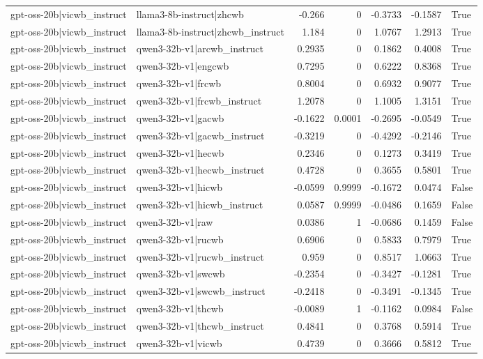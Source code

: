 \begin{table}
\begin{tabular}{l l r r r r l}
gpt-oss-20b|vicwb_instruct & llama3-8b-instruct|zhcwb & -0.266 & 0 & -0.3733 & -0.1587 & True \\
gpt-oss-20b|vicwb_instruct & llama3-8b-instruct|zhcwb_instruct & 1.184 & 0 & 1.0767 & 1.2913 & True \\
gpt-oss-20b|vicwb_instruct & qwen3-32b-v1|arcwb_instruct & 0.2935 & 0 & 0.1862 & 0.4008 & True \\
gpt-oss-20b|vicwb_instruct & qwen3-32b-v1|engcwb & 0.7295 & 0 & 0.6222 & 0.8368 & True \\
gpt-oss-20b|vicwb_instruct & qwen3-32b-v1|frcwb & 0.8004 & 0 & 0.6932 & 0.9077 & True \\
gpt-oss-20b|vicwb_instruct & qwen3-32b-v1|frcwb_instruct & 1.2078 & 0 & 1.1005 & 1.3151 & True \\
gpt-oss-20b|vicwb_instruct & qwen3-32b-v1|gacwb & -0.1622 & 0.0001 & -0.2695 & -0.0549 & True \\
gpt-oss-20b|vicwb_instruct & qwen3-32b-v1|gacwb_instruct & -0.3219 & 0 & -0.4292 & -0.2146 & True \\
gpt-oss-20b|vicwb_instruct & qwen3-32b-v1|hecwb & 0.2346 & 0 & 0.1273 & 0.3419 & True \\
gpt-oss-20b|vicwb_instruct & qwen3-32b-v1|hecwb_instruct & 0.4728 & 0 & 0.3655 & 0.5801 & True \\
gpt-oss-20b|vicwb_instruct & qwen3-32b-v1|hicwb & -0.0599 & 0.9999 & -0.1672 & 0.0474 & False \\
gpt-oss-20b|vicwb_instruct & qwen3-32b-v1|hicwb_instruct & 0.0587 & 0.9999 & -0.0486 & 0.1659 & False \\
gpt-oss-20b|vicwb_instruct & qwen3-32b-v1|raw & 0.0386 & 1 & -0.0686 & 0.1459 & False \\
gpt-oss-20b|vicwb_instruct & qwen3-32b-v1|rucwb & 0.6906 & 0 & 0.5833 & 0.7979 & True \\
gpt-oss-20b|vicwb_instruct & qwen3-32b-v1|rucwb_instruct & 0.959 & 0 & 0.8517 & 1.0663 & True \\
gpt-oss-20b|vicwb_instruct & qwen3-32b-v1|swcwb & -0.2354 & 0 & -0.3427 & -0.1281 & True \\
gpt-oss-20b|vicwb_instruct & qwen3-32b-v1|swcwb_instruct & -0.2418 & 0 & -0.3491 & -0.1345 & True \\
gpt-oss-20b|vicwb_instruct & qwen3-32b-v1|thcwb & -0.0089 & 1 & -0.1162 & 0.0984 & False \\
gpt-oss-20b|vicwb_instruct & qwen3-32b-v1|thcwb_instruct & 0.4841 & 0 & 0.3768 & 0.5914 & True \\
gpt-oss-20b|vicwb_instruct & qwen3-32b-v1|vicwb & 0.4739 & 0 & 0.3666 & 0.5812 & True \\

\end{tabular}
\end{table}
